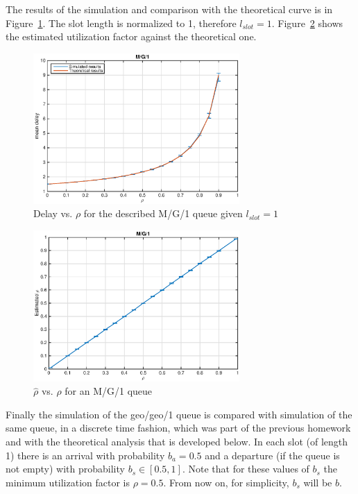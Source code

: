 \documentclass[10pt]{article}
\begin{document}
The results of the simulation and comparison with the theoretical curve is in Figure~\ref{fig:mg1_dl}. The slot length is normalized to 1, therefore $l_{slot} = 1$. Figure~\ref{fig:mg1_rho} shows the estimated utilization factor against the theoretical one.

\begin{figure}[h!]
	\centering
	\includegraphics[width = 0.7\textwidth]{mg1_dl}
	\caption{Delay vs. $\rho$ for the described M/G/1 queue given $l_{slot} = 1$}
	\label{fig:mg1_dl}
\end{figure}

\begin{figure}[h!]
	\centering
	\includegraphics[width = 0.7\textwidth]{mg1_rho}
	\caption{$\hat{\rho}$ vs. $\rho$ for an M/G/1 queue}
	\label{fig:mg1_rho}
\end{figure}

Finally the simulation of the geo/geo/1 queue is compared with simulation of the same queue, in a discrete time fashion, which was part of the previous homework and with the theoretical analysis that is developed below. In each slot (of length 1) there is an arrival with probability $b_a = 0.5$ and a departure (if the queue is not empty) with probability $b_s \in [0.5, 1]$. Note that for these values of $b_s$ the minimum utilization factor is $\rho = 0.5$. 
From now on, for simplicity, $b_s$ will be $b$.
\end{document}
